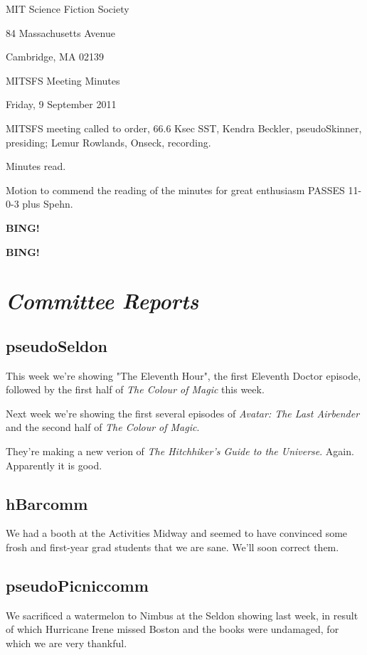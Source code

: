 \documentclass[10pt]{article}
\newcommand{\bing}{{\bf BING!} }
\newcommand{\goto}[1]{\bing \vskip 12pt \section*{{\em{#1}}}}
\newcommand{\ps}{ plus Spehn\xspace}
\newcommand{\skinner}{Kendra Beckler, pseudoSkinner}
\newcommand{\onseck}{Lemur Rowlands, Onseck}
\newcommand{\meetingdate}{Friday, 9 September 2011}
\begin{document}
\begin{center}

MIT Science Fiction Society

84 Massachusetts Avenue

Cambridge, MA 02139

\vspace{12pt}

MITSFS Meeting Minutes

\meetingdate

\end{center}

\vspace{18pt}

\setlength{\parskip}{6pt}

\noindent
MITSFS meeting called to order, 66.6 Ksec SST,
\skinner, presiding; \onseck, recording.

Minutes read.

Motion to commend the reading of the minutes for great enthusiasm
PASSES 11-0-3\ps.

\bing

\goto{Committee Reports}

\subsection*{pseudoSeldon}

This week we're showing "The Eleventh Hour", the first Eleventh
Doctor episode, followed by the first half of \emph{The Colour of
Magic} this week.

Next week we're showing the first several episodes of \emph{Avatar:
The Last Airbender} and the second half of \emph{The Colour of Magic}.

They're making a new verion of \emph{The Hitchhiker's Guide to the 
Universe}.  Again.  Apparently it is good.


\subsection*{hBarcomm}

We had a booth at the Activities Midway and seemed to have convinced some
frosh and first-year grad students that we are sane.  We'll soon correct
them.


\subsection*{pseudoPicniccomm}

We sacrificed a watermelon to Nimbus at the Seldon showing last week,
in result of which Hurricane Irene missed Boston and the books were
undamaged, for which we are very thankful.
\end{document}

